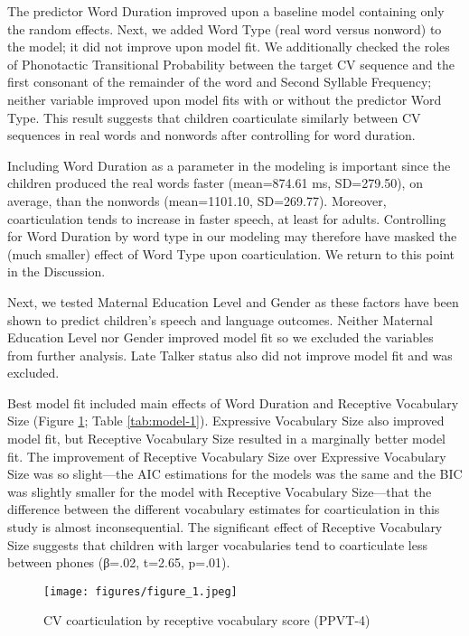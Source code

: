 \documentclass[a4paper,man,natbib,donotrepeattitle, apacite]{apa6}
\begin{document}
The predictor Word Duration improved upon a baseline model containing only the random effects. Next, we added Word Type (real word versus nonword) to the model; it did not improve upon model fit. We additionally checked the roles of Phonotactic Transitional Probability between the target CV sequence and the first consonant of the remainder of the word and Second Syllable Frequency; neither variable improved upon model fits with or without the predictor Word Type. This result suggests that children coarticulate similarly between CV sequences in real words and nonwords after controlling for word duration. 

Including Word Duration as a parameter in the modeling is important since the children produced the real words faster (mean=874.61 ms, SD=279.50), on average, than the nonwords (mean=1101.10, SD=269.77). Moreover, coarticulation tends to increase in faster speech, at least for adults. Controlling for Word Duration by word type in our modeling may therefore have masked the (much smaller) effect of Word Type upon coarticulation. We return to this point in the Discussion.    

Next, we tested Maternal Education Level and Gender as these factors have been shown to predict children’s speech and language outcomes. Neither Maternal Education Level nor Gender improved model fit so we excluded the variables from further analysis. Late Talker status also did not improve model fit and was excluded. 

Best model fit included main effects of Word Duration and Receptive Vocabulary Size (Figure \ref{fig:figure-1}; Table \ref{tab:model-1}). Expressive Vocabulary Size also improved model fit, but Receptive Vocabulary Size resulted in a marginally better model fit. The improvement of Receptive Vocabulary Size over Expressive Vocabulary Size was so slight---the AIC estimations for the models was the same and the BIC was slightly smaller for the model with Receptive Vocabulary Size---that the difference between the different vocabulary estimates for coarticulation in this study is almost inconsequential. The significant effect of Receptive Vocabulary Size suggests that children with larger vocabularies tend to coarticulate less between phones (β=.02, t=2.65,  p=.01). 

\begin{figure}[H]
\centering
\texttt{[image: figures/figure\_1.jpeg]}
\caption{\label{fig:figure-1}CV coarticulation by receptive vocabulary score (PPVT-4)}
\end{figure}
\end{document}
